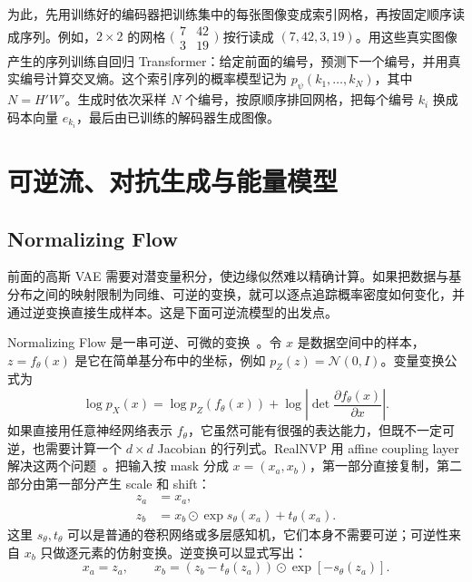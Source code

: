 为此，先用训练好的编码器把训练集中的每张图像变成索引网格，再按固定顺序读成序列。例如，\(2\times2\) 的网格 \(\bigl(\begin{smallmatrix}7&42\\3&19\end{smallmatrix}\bigr)\) 按行读成 \((7,42,3,19)\)。用这些真实图像产生的序列训练自回归 Transformer：给定前面的编号，预测下一个编号，并用真实编号计算交叉熵。这个索引序列的概率模型记为 \(p_\psi(k_1,\ldots,k_N)\)，其中 \(N=H'W'\)。生成时依次采样 \(N\) 个编号，按原顺序排回网格，把每个编号 \(k_i\) 换成码本向量 \(e_{k_i}\)，最后由已训练的解码器生成图像。

\section{可逆流、对抗生成与能量模型}

\subsection{Normalizing Flow}

前面的高斯 VAE 需要对潜变量积分，使边缘似然难以精确计算。如果把数据与基分布之间的映射限制为同维、可逆的变换，就可以逐点追踪概率密度如何变化，并通过逆变换直接生成样本。这是下面可逆流模型的出发点。

Normalizing Flow 是一串可逆、可微的变换~\cite{papamakarios2021normalizing}。令 \(x\) 是数据空间中的样本，\(z=f_\theta(x)\) 是它在简单基分布中的坐标，例如 \(p_Z(z)=\mathcal N(0,I)\)。变量变换公式为
\begin{equation}
 \log p_X(x)=\log p_Z(f_\theta(x))+\log\left|\det\frac{\partial f_\theta(x)}{\partial x}\right|.
\end{equation}
如果直接用任意神经网络表示 \(f_\theta\)，它虽然可能有很强的表达能力，但既不一定可逆，也需要计算一个 \(d\times d\) Jacobian 的行列式。RealNVP 用 affine coupling layer 解决这两个问题~\cite{dinh2016density}。把输入按 mask 分成 \(x=(x_a,x_b)\)，第一部分直接复制，第二部分由第一部分产生 scale 和 shift：
\begin{align}
 z_a&=x_a,\\
 z_b&=x_b\odot\exp s_\theta(x_a)+t_\theta(x_a).
\end{align}
这里 \(s_\theta,t_\theta\) 可以是普通的卷积网络或多层感知机，它们本身不需要可逆；可逆性来自 \(x_b\) 只做逐元素的仿射变换。逆变换可以显式写出：
\begin{equation}
 x_a=z_a,\qquad
 x_b=\left(z_b-t_\theta(z_a)\right)\odot\exp[-s_\theta(z_a)].
\end{equation}

